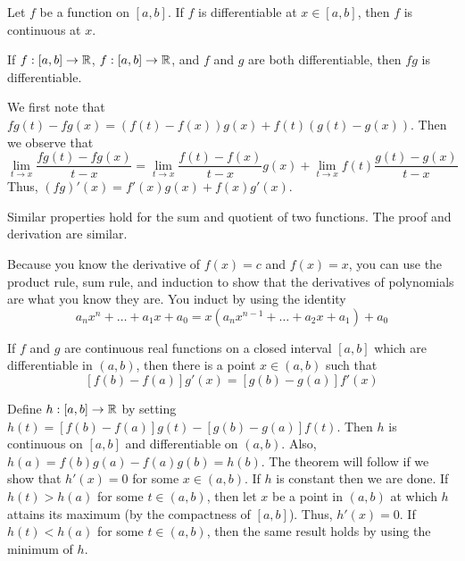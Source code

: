 \documentclass{mathnotes}
\begin{document}
\begin{thm}
  Let $f$ be a function on $[a,b]$. If $f$ is differentiable at $x\in[a,b]$,
  then $f$ is continuous at $x$.
\end{thm}

\begin{prop}
  If $f:[a,b]\to\mathbb{R}$, $f:[a,b]\to\mathbb{R}$, and $f$ and $g$ are both differentiable,
  then $fg$ is differentiable.
\end{prop}

\begin{pf}
  We first note that $fg(t)-fg(x)=(f(t)-f(x))g(x)+f(t)(g(t)-g(x))$. Then we
  observe that
  $$\lim_{t\to x}\frac{fg(t)-fg(x)}{t-x}=\lim_{t\to x}\frac{f(t)-f(x)}{t-x}
  g(x)+\lim_{t\to x}f(t)\frac{g(t)-g(x)}{t-x}$$
  Thus, $(fg)'(x)=f'(x)g(x)+f(x)g'(x)$.
\end{pf}

\begin{note}
  Similar properties hold for the sum and quotient of two functions. The proof
  and derivation are similar.
\end{note}

\begin{note}
  Because you know the derivative of $f(x)=c$ and $f(x)=x$, you can use the
  product rule, sum rule, and induction to show that the derivatives of
  polynomials are what you know they are. You induct by using the identity
  $$a_nx^n+\ldots+a_1x+a_0=x(a_nx^{n-1}+\ldots+a_2x+a_1)+a_0$$
\end{note}

\begin{thm}
  If $f$ and $g$ are continuous real functions on a closed interval $[a,b]$
  which are differentiable in $(a,b)$, then there is a point $x\in(a,b)$ such
  that
  $$[f(b)-f(a)]g'(x)=[g(b)-g(a)]f'(x)$$
\end{thm}

\begin{pf}
  Define $h:[a,b]\to\mathbb{R}$ by setting $h(t)=[f(b)-f(a)]g(t)-[g(b)-g(a)]f(t)$.
  Then $h$ is continuous on $[a,b]$ and differentiable on $(a,b)$. Also,
  $h(a)=f(b)g(a)-f(a)g(b)=h(b)$. The theorem will follow if we show that
  $h'(x)=0$ for some $x\in(a,b)$. If $h$ is constant then we are done. If
  $h(t)>h(a)$ for some $t\in(a,b)$, then let $x$ be a point in $(a,b)$ at which
  $h$ attains its maximum (by the compactness of $[a,b]$). Thus, $h'(x)=0$. If
  $h(t)<h(a)$ for some $t\in(a,b)$, then the same result holds by using the
  minimum of $h$.
\end{pf}
\end{document}
